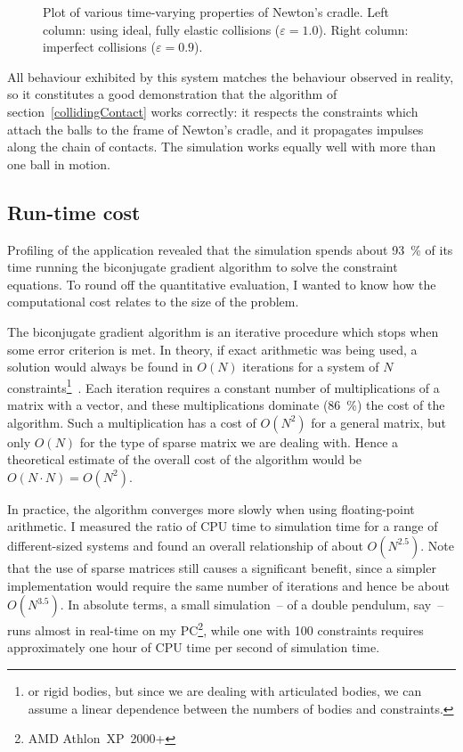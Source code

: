 \begin{figure}
\centerline{}
\caption{Plot of various time-varying properties of Newton's cradle. Left column: using ideal,
    fully elastic collisions ($\varepsilon = 1.0$). Right column: imperfect collisions
    ($\varepsilon = 0.9$).\label{cradlePlots}}
\end{figure}

All behaviour exhibited by this system matches the behaviour observed in reality, so it
constitutes a good demonstration that the algorithm of section~\ref{collidingContact}
works correctly: it respects the constraints which attach the balls to the frame of Newton's
cradle, and it propagates impulses along the chain of contacts. The simulation works equally
well with more than one ball in motion.

\subsection{Run-time cost}

Profiling of the application revealed that the simulation spends about 93~\% of its time running
the biconjugate gradient algorithm to solve the constraint equations. To round off the quantitative
evaluation, I wanted to know how the computational cost relates to the size of the problem.

The biconjugate gradient algorithm is an iterative procedure which stops when some error
criterion is met. In theory, if exact arithmetic was being used, a solution would always be found
in $O(N)$ iterations for a system of $N$ constraints\footnote{or rigid bodies, but since we are
dealing with articulated bodies, we can assume a linear dependence between the numbers of bodies
and constraints.}~\cite{NRinC}. Each iteration requires a constant number of multiplications of a
matrix with a vector, and these multiplications dominate (86~\%) the cost of the algorithm. Such
a multiplication has a cost of $O(N^2)$ for a general matrix, but only
$O(N)$ for the type of sparse matrix we are dealing with. Hence a theoretical estimate of the
overall cost of the algorithm would be $O(N\cdot N) = O(N^2)$.

In practice, the algorithm converges more slowly when using floating-point arithmetic.
I measured the ratio of CPU time to simulation time for a range of different-sized systems and
found an overall relationship of about $O(N^{2.5})$. Note that the use of sparse matrices still
causes a significant benefit, since a simpler implementation would require the same number of
iterations and hence be about $O(N^{3.5})$. In absolute terms, a small simulation~-- of a
double pendulum, say~-- runs almost in real-time on my PC\footnote{AMD Athlon~XP~2000+},
while one with 100 constraints requires approximately one hour of CPU time per second of
simulation time.

